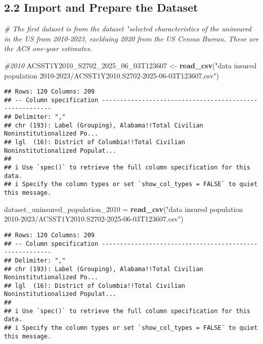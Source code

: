 \documentclass[
]{article}
\newenvironment{Shaded}{\begin{snugshade}}{\end{snugshade}}
\newcommand{\CommentTok}[1]{\textcolor[rgb]{0.56,0.35,0.01}{\textit{#1}}}
\newcommand{\FunctionTok}[1]{\textcolor[rgb]{0.13,0.29,0.53}{\textbf{#1}}}
\newcommand{\NormalTok}[1]{#1}
\newcommand{\OtherTok}[1]{\textcolor[rgb]{0.56,0.35,0.01}{#1}}
\newcommand{\StringTok}[1]{\textcolor[rgb]{0.31,0.60,0.02}{#1}}
\begin{document}
\subsection{2.2 Import and Prepare the
Dataset}\label{import-and-prepare-the-dataset}

\begin{Shaded}
\begin{Highlighting}[]
\CommentTok{\# The first dataset is from the dataset "selected characteristics of the uninsured in the US from 2010{-}2023, exclduing 2020 from the US Census Bureau. These are the ACS one{-}year estimates.}

\CommentTok{\#2010}
\NormalTok{ACSST1Y2010\_S2702\_2025\_06\_03T123607 }\OtherTok{\textless{}{-}} \FunctionTok{read\_csv}\NormalTok{(}\StringTok{"data insured population 2010{-}2023/ACSST1Y2010.S2702{-}2025{-}06{-}03T123607.csv"}\NormalTok{)}
\end{Highlighting}
\end{Shaded}

\begin{verbatim}
## Rows: 120 Columns: 209
## -- Column specification --------------------------------------------------------
## Delimiter: ","
## chr (193): Label (Grouping), Alabama!!Total Civilian Noninstitutionalized Po...
## lgl  (16): District of Columbia!!Total Civilian Noninstitutionalized Populat...
## 
## i Use `spec()` to retrieve the full column specification for this data.
## i Specify the column types or set `show_col_types = FALSE` to quiet this message.
\end{verbatim}

\begin{Shaded}
\begin{Highlighting}[]
\NormalTok{dataset\_uninsured\_population\_2010 }\OtherTok{=} \FunctionTok{read\_csv}\NormalTok{(}\StringTok{"data insured population 2010{-}2023/ACSST1Y2010.S2702{-}2025{-}06{-}03T123607.csv"}\NormalTok{)}
\end{Highlighting}
\end{Shaded}

\begin{verbatim}
## Rows: 120 Columns: 209
## -- Column specification --------------------------------------------------------
## Delimiter: ","
## chr (193): Label (Grouping), Alabama!!Total Civilian Noninstitutionalized Po...
## lgl  (16): District of Columbia!!Total Civilian Noninstitutionalized Populat...
## 
## i Use `spec()` to retrieve the full column specification for this data.
## i Specify the column types or set `show_col_types = FALSE` to quiet this message.
\end{verbatim}
\end{document}
